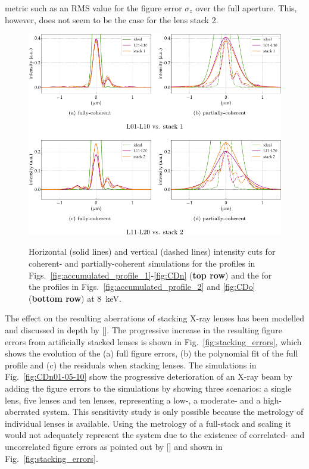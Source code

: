 \begin{refsection}
metric such as an RMS value for the figure error $\sigma_z$ over the full aperture. This, however, does not seem to be the case for the lens stack 2.

\begin{figure}[t]
    \centering
    {\includegraphics[width=0.75\linewidth]{figures/ch05/CD_Strehl.pdf}}
    \caption[Strehl ratio of L01-L10 vs. stack 1 and L11-L20 vs. stack 2 simulations]{Horizontal (solid lines) and vertical (dashed lines) intensity cuts for coherent- and partially-coherent simulations for the profiles in Figs.~\ref{fig:accumulated_profile_1}-\ref{fig:CDn} (\textbf{top row}) and the for the profiles in Figs.~\ref{fig:accumulated_profile_2} and \ref{fig:CDo} (\textbf{bottom row}) at 8~keV. }
    \label{fig:CD_Strehl}
\end{figure}

The effect on the resulting aberrations of stacking X-ray lenses has been modelled and discussed in depth by [\cite{Osterhoff2017}]. The progressive increase in the resulting figure errors from artificially stacked lenses is shown in Fig.~\ref{fig:stacking_errors}, which shows the evolution of the (a) full figure errors, (b) the polynomial fit of the full profile and (c) the residuals when stacking lenses. The simulations in Fig.~\ref{fig:CDn01-05-10} show the progressive deterioration of an X-ray beam by adding the figure errors to the simulations by showing three scenarios: a single lens, five lenses and ten lenses, representing a low-, a moderate- and a high-aberrated system. This sensitivity study is only possible because the metrology of individual lenses is available. Using the metrology of a full-stack and scaling it would not adequately represent the system due to the existence of correlated- and uncorrelated figure errors as pointed out by [\cite{Osterhoff2017}] and shown in Fig.~\ref{fig:stacking_errors}.


\end{refsection}
